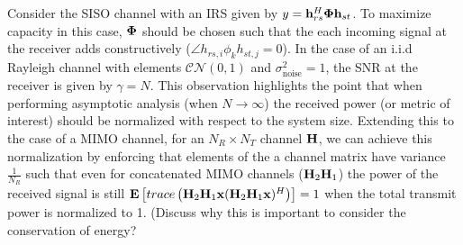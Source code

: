 Consider the SISO channel with an IRS given by $y = \mathbf{h}_{rs}^H \boldsymbol{\Phi} \mathbf{h}_{st}$. To maximize capacity in this case, $ \boldsymbol{\Phi}$ should be chosen such that 
the each incoming signal at the receiver adds constructively (\eg $\angle h_{rs,i} \phi_k h_{st,j} = 0$). 
In the case of an i.i.d Rayleigh channel with elements $\mathcal{CN} (0,1)$ and $\sigma^2_{\text{noise}} =1$, the SNR at the receiver is given by $\gamma = N$.
This observation highlights the point that when performing asymptotic analysis (\ie when $N \rightarrow \infty$) the received power (or metric of interest) should be normalized with respect to the system size.
Extending this to the case of a MIMO channel, for an $N_R \times N_T$ channel $\mathbf{H}$, we can achieve this normalization by enforcing that elements of the a channel matrix  have variance $\frac{1}{N_R}$ such that even for concatenated MIMO channels (\eg $\mathbf{H}_2 \mathbf{H}_1$) the power of the received signal is still
 $\mathop{\bf E{}} \left[ \mathop{trace} \left(\mathbf{H}_2 \mathbf{H}_1\mathbf{x} (\mathbf{H}_2 \mathbf{H}_1\mathbf{x})^H \right)\right] = 1$ when the total transmit power is normalized to 1. 
 (Discuss why this is important to consider the conservation of energy?
